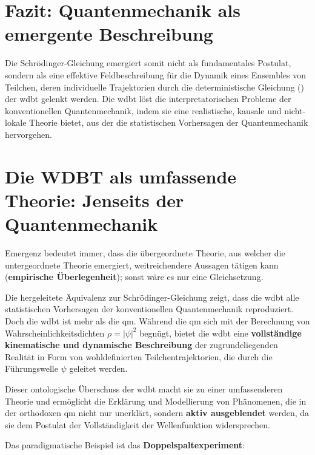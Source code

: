 \section{Fazit: Quantenmechanik als emergente Beschreibung}
Die Schrödinger-Gleichung emergiert somit nicht als fundamentales Postulat, sondern als eine effektive Feldbeschreibung für die Dynamik eines Ensembles von Teilchen, deren individuelle Trajektorien
durch die deterministische Gleichung () der \gls{wdbt} gelenkt werden. Die \gls{wdbt} löst die interpretatorischen Probleme der konventionellen
Quantenmechanik, indem sie eine realistische, kausale und nicht-lokale Theorie bietet, aus der die statistischen Vorhersagen der Quantenmechanik hervorgehen.

\section{Die WDBT als umfassende Theorie: Jenseits der Quantenmechanik}
Emergenz bedeutet immer, dass die übergeordnete Theorie, aus welcher die untergeordnete Theorie emergiert, weitreichendere Aussagen tätigen kann (\textbf{empirische Überlegenheit}); sonst wäre es
nur eine Gleichsetzung.

Die hergeleitete Äquivalenz zur Schrödinger-Gleichung zeigt, dass die \gls{wdbt} alle statistischen Vorhersagen der konventionellen Quantenmechanik reproduziert. Doch die \gls{wdbt} ist mehr als die \gls{qm}.
Während die \gls{qm} sich mit der Berechnung von Wahrscheinlichkeitsdichten $\rho = \left| \psi \right|^2$ begnügt, bietet die \gls{wdbt} eine \textbf{vollständige kinematische und dynamische Beschreibung}
der zugrundeliegenden Realität in Form von wohldefinierten Teilchentrajektorien, die durch die Führungswelle $\psi$ geleitet werden.

Dieser ontologische Überschuss der \gls{wdbt} macht sie zu einer umfassenderen Theorie und ermöglicht die Erklärung und Modellierung von Phänomenen, die in der orthodoxen \gls{qm} nicht nur unerklärt,
sondern \textbf{aktiv ausgeblendet} werden, da sie dem Postulat der Vollständigkeit der Wellenfunktion widersprechen.

Das paradigmatische Beispiel ist das \textbf{Doppelspaltexperiment}:

